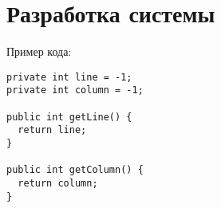 \chapter{Разработка системы}

Пример кода:

\begin{lstlisting}[style=java]
private int line = -1;
private int column = -1;

public int getLine() {
  return line;
}

public int getColumn() {
  return column;
}
\end{lstlisting}